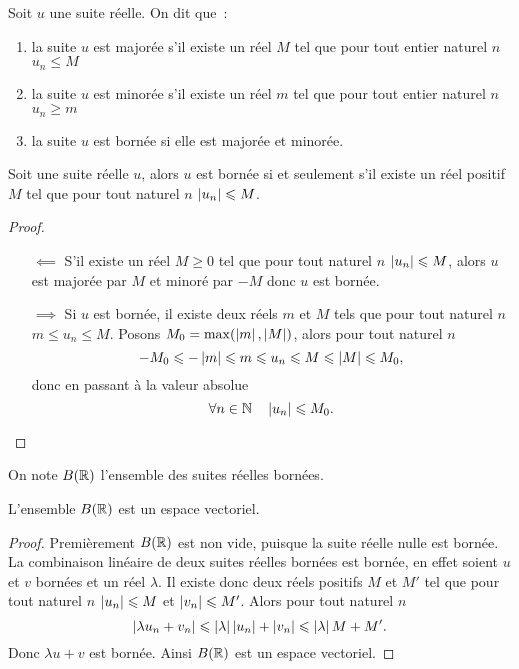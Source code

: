 \begin{defdef}
  Soit \(u\) une suite réelle. On dit que~:
  \begin{enumerate}
  \item la suite \(u\) est majorée s'il existe un réel \(M\) tel que pour tout entier naturel \(n\) \(u_n\leqslant M\)
  \item la suite \(u\) est minorée s'il existe un réel \(m\) tel que pour tout entier naturel \(n\) \(u_n\geqslant m\)
  \item la suite \(u\) est bornée si elle est majorée et minorée.
  \end{enumerate}
\end{defdef}
\begin{prop}
  Soit une suite réelle \(u\), alors \(u\) est bornée si et seulement s'il existe un réel positif \(M\) tel que pour tout naturel \(n\) \(\left\lvert u_n\right\rvert\leqslant M\).
\end{prop}
\begin{proof}
  \begin{itemize}
  \item[\(\impliedby\)] S'il existe un réel \(M\geqslant 0\) tel que pour tout naturel \(n\) \(\left\lvert u_n\right\rvert\leqslant M\), alors \(u\) est majorée par \(M\) et minoré par \(-M\) donc \(u\) est bornée.
  \item[\(\implies\)] Si \(u\) est bornée, il existe deux réels \(m\) et \(M\) tels que pour tout naturel \(n\) \(m\leqslant u_n \leqslant M\). Posons \(M_0=\max(\left\lvert m\right\rvert,\left\lvert M\right\rvert)\), alors pour tout naturel \(n\)
    \begin{equation}
      -M_0\leqslant -\left\lvert m\right\rvert \leqslant m\leqslant u_n\leqslant M\leqslant \left\lvert M\right\rvert\leqslant M_0,
    \end{equation}
    donc en passant à la valeur absolue
    \begin{equation}
      \forall n \in \mathbb{N} \quad \left\lvert u_n\right\rvert\leqslant M_0.
    \end{equation}
  \end{itemize}
\end{proof}
On note \(B(\mathbb{R})\) l'ensemble des suites réelles bornées.
\begin{prop}
  L'ensemble \(B(\mathbb{R})\) est un espace vectoriel.
\end{prop}
\begin{proof}
  Premièrement \(B(\mathbb{R})\) est non vide, puisque la suite réelle nulle est bornée. La combinaison linéaire de deux suites réelles bornées est bornée, en effet soient \(u\) et \(v\) bornées et un réel \(\lambda\). Il existe donc deux réels positifs \(M\) et \(M'\) tel que pour tout naturel \(n\) \(\left\lvert u_n\right\rvert\leqslant M\) et \(\left\lvert v_n\right\rvert\leqslant M'\). Alors pour tout naturel \(n\)
  \begin{equation}
    \left\lvert\lambda u_n + v_n\right\rvert\leqslant \left\lvert\lambda\right\rvert\left\lvert u_n\right\rvert+\left\lvert v_n\right\rvert\leqslant \left\lvert\lambda\right\rvert M+M'.
  \end{equation}
Donc \(\lambda u+v\) est bornée. Ainsi \(B(\mathbb{R})\) est un espace vectoriel.
\end{proof}

